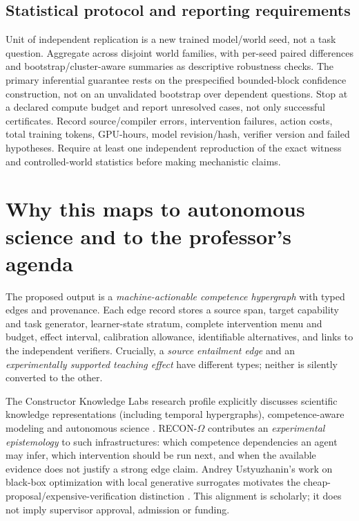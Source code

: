 \documentclass[11pt,a4paper]{article}
\theoremstyle{definition}\newtheorem{definition}[theorem]{Definition}
\theoremstyle{remark}\newtheorem{remark}[theorem]{Remark}
\begin{document}
\subsection{Statistical protocol and reporting requirements}
Unit of independent replication is a new trained model/world seed, not a task question. Aggregate across disjoint world families, with per-seed paired differences and bootstrap/cluster-aware summaries as descriptive robustness checks. The primary inferential guarantee rests on the prespecified bounded-block confidence construction, not on an unvalidated bootstrap over dependent questions. Stop at a declared compute budget and report unresolved cases, not only successful certificates. Record source/compiler errors, intervention failures, action costs, total training tokens, GPU-hours, model revision/hash, verifier version and failed hypotheses. Require at least one independent reproduction of the exact witness and controlled-world statistics before making mechanistic claims.

\section{Why this maps to autonomous science and to the professor's agenda}\label{sec:fit}
The proposed output is a \emph{machine-actionable competence hypergraph} with typed edges and provenance. Each edge record stores a source span, target capability and task generator, learner-state stratum, complete intervention menu and budget, effect interval, calibration allowance, identifiable alternatives, and links to the independent verifiers. Crucially, a \emph{source entailment edge} and an \emph{experimentally supported teaching effect} have different types; neither is silently converted to the other.

The Constructor Knowledge Labs research profile explicitly discusses scientific knowledge representations (including temporal hypergraphs), competence-aware modeling and autonomous science \citep{constructor}. RECON-$\Omega$ contributes an \emph{experimental epistemology} to such infrastructures: which competence dependencies an agent may infer, which intervention should be run next, and when the available evidence does not justify a strong edge claim. Andrey Ustyuzhanin's work on black-box optimization with local generative surrogates motivates the cheap-proposal/expensive-verification distinction \citep{surrogate}. This alignment is scholarly; it does not imply supervisor approval, admission or funding.
\end{document}
